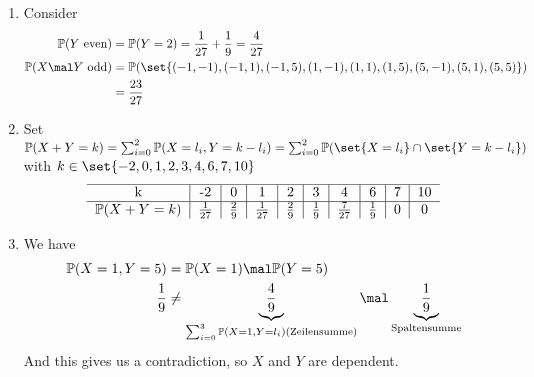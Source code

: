 \subsection{}
\begin{solution}
	\begin{enumerate}
		\item Consider\
		\begin{align*}
			\meas(Y \text{ even}) &= \meas(Y=2) = \frac{1}{27} + \frac{1}{9} = \frac{4}{27}\\
			\meas(X\mal Y \text{ odd}) &= \meas(\set{(-1,-1), (-1,1),(-1,5),(1,-1),(1,1),(1,5),(5,-1),(5,1),(5,5)})\\
			&= \frac{23}{27}
		\end{align*}
		\item Set $\meas(X+Y = k) = \sum_{i=0}^2 \meas(X=l_i , Y= k -l_i) = \sum_{i=0}^2 \meas(\set{X=l_i} \cap \set{Y = k-l_i})$ with $k \in \set{-2,0,1,2,3,4,6,7,10}$
		\begin{align*}
			\begin{tabular}{c|c|c|c|c|c|c|c|c|c}
				\hline
				k               & -2             & 0              & 1              & 2             & 3             & 4                & 6              & 7            & 10\\ \hline
				$\meas(X+Y=k)$  & $\frac{1}{27}$ & $\frac{2}{9}$  & $\frac{1}{27}$ & $\frac{2}{9}$ & $\frac{1}{9}$ & $\frac{7}{27}$   & $\frac{1}{9}$  & 0            & 0
			\end{tabular}
		\end{align*}	
		\item We have 
		\begin{align*}
			\meas(X=1,Y=5) &= \meas(X=1) \mal \meas(Y=5)\\
			\frac{1}{9}&\neq \underbrace{\frac{4}{9}}_{\sum_{i=0}^3 \meas(X=1, Y=l_i) \text{(Zeilensumme)}} \mal \underbrace{\frac{1}{9}}_{\text{Spaltensumme}}
		\end{align*}
		And this gives us a contradiction, so $X$ and $Y$ are dependent.
	\end{enumerate}
\end{solution}
